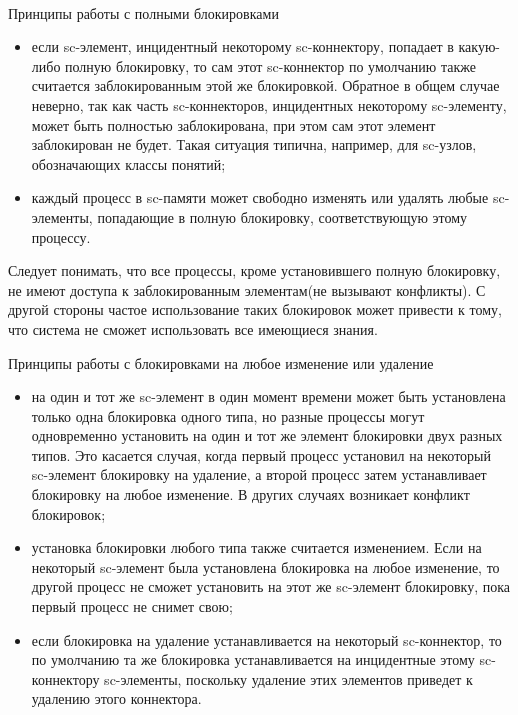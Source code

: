 \begin{frame}{\\Принципы работы с полными блокировками}
\topline
\vspace{30pt}
     \\

    \begin{itemize}
	\item если sc-элемент, инцидентный некоторому sc-коннектору, попадает в какую-либо полную блокировку, то сам этот sc-коннектор по умолчанию также считается заблокированным этой же блокировкой. Обратное в общем случае неверно, так как часть sc-коннекторов, инцидентных некоторому sc-элементу, может быть полностью заблокирована, при этом сам этот элемент заблокирован не будет. Такая ситуация типична, например, для sc-узлов, обозначающих классы понятий;
	\item каждый процесс в sc-памяти может свободно изменять или удалять любые sc-элементы, попадающие в полную блокировку, соответствующую этому процессу.
\end{itemize}
Следует понимать, что все процессы, кроме установившего полную блокировку, не имеют доступа к заблокированным элементам(не вызывают конфликты). С другой стороны частое использование таких блокировок может привести к тому, что система не сможет использовать все имеющиеся знания.
\end{frame}

\begin{frame}{Принципы работы с блокировками на любое изменение или удаление}
\topline
\vspace{30pt}
 \\

    \begin{itemize}
	\item на один и тот же sc-элемент в один момент времени может быть установлена только одна блокировка одного типа, но разные процессы могут одновременно установить на один и тот же элемент блокировки двух разных типов. Это касается случая, когда первый процесс установил на некоторый sc-элемент блокировку на удаление, а второй процесс затем устанавливает блокировку на любое изменение. В других случаях возникает конфликт блокировок;
	\item установка блокировки любого типа также считается изменением. Если на некоторый \mbox{sc-элемент} была установлена блокировка на любое изменение, то другой процесс не сможет установить на этот же sc-элемент блокировку, пока первый процесс не снимет свою;
	\item если блокировка на удаление устанавливается на некоторый sc-коннектор, то по умолчанию та же блокировка устанавливается на инцидентные этому sc-коннектору sc-элементы, поскольку удаление этих элементов приведет к удалению этого коннектора.
\end{itemize}
\end{frame}

